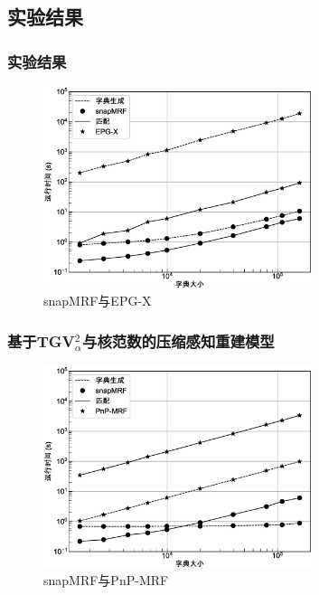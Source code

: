 \documentclass{beamer}
\begin{document}
\subsection{实验结果}
\begin{frame}
	\frametitle{实验结果}
	\begin{figure}[htbp]
	\centering
		\includegraphics[width=0.7\textwidth]{../img/snapmrf/time_vs_epgx.eps}
	\caption{snapMRF与EPG-X}
\end{figure}
\end{frame}

\begin{frame}
	\frametitle{基于TGV$_\alpha^2$与核范数的压缩感知重建模型}
	\begin{figure}[htbp]
	\centering
		\includegraphics[width=0.7\textwidth]{../img/snapmrf/time_vs_pnp.eps}
	\caption{snapMRF与PnP-MRF}
\end{figure}
\end{frame}
\end{document}
